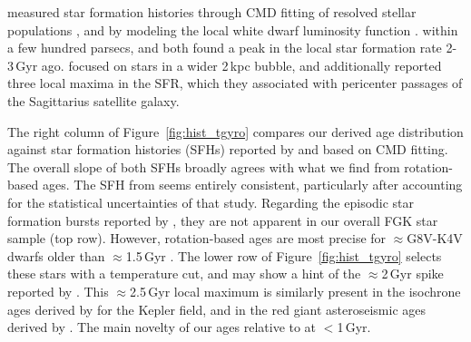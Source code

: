 \documentclass[11pt,twocolumn,tighten]{aastex63}
\begin{document}
 measured star formation histories
through CMD fitting of resolved stellar populations
\citep[][]{2019A&A...624L...1M,2020NatAs...4..965R,2021MNRAS.501..302A,2022Natur.603..599X},
and by modeling the local white dwarf luminosity function
\citep[e.g.][]{2019ApJ...878L..11I}.  \citet{2019A&A...624L...1M}  within a few hundred parsecs, and both found a peak in the
local star formation rate 2-3\,Gyr ago.  \citet{2020NatAs...4..965R}
focused on stars in a wider 2\,kpc bubble, and additionally reported
three local maxima in the SFR, which they
associated with pericenter passages of the Sagittarius satellite
galaxy.

The right column of Figure~\ref{fig:hist_tgyro} compares our derived
age distribution against star formation histories (SFHs) reported by
\citet{2019A&A...624L...1M} and \citet{2020NatAs...4..965R} based on
CMD fitting.  The overall slope of both SFHs broadly agrees with what
we find from rotation-based ages.  The SFH from
\citet{2019A&A...624L...1M} seems entirely consistent, particularly
after accounting for the statistical uncertainties of that study.
Regarding the episodic star formation bursts reported by
\citet{2020NatAs...4..965R}, they are not apparent in our overall FGK
star sample (top row).  However, rotation-based ages are most precise
for $\approx$G8V-K4V dwarfs older than $\approx$1.5\,Gyr
\citep{Bouma_2023}.  The lower row of Figure~\ref{fig:hist_tgyro}
selects these stars with a temperature cut, and may show a hint of the
$\approx$2\,Gyr spike reported by \citet{2020NatAs...4..965R}.   This
$\approx$2.5\,Gyr local maximum is similarly present in the isochrone
ages derived by \citet{Berger_2020a_catalog} for the Kepler field, and
in the red giant asteroseismic ages derived by
\citet{SilvaAguirre2018}.  The main novelty of our ages relative to
 at $<$1\,Gyr.
\end{document}
